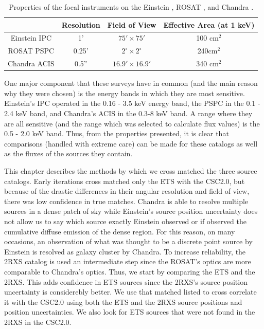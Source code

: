 \begin{table}[H]
    \centering
    \begin{tabular}{cccc}
    \hline
    \hline
          &Resolution & Field of View & Effective Area (at 1 keV) \\
         \hline
        Einstein IPC    & 1'&$75' \times 75'$   & 100 cm$^2$ \\
        ROSAT PSPC    &  0.25'  &  $2^{\circ}\times 2^{\circ}$ & 240cm$^2$  \\
        Chandra ACIS & 0.5'' & $16.9' \times 16.9'$ & 340 cm$^2$ \\
    \hline
    \hline
    \end{tabular}
    \caption{Properties of the focal instruments on the Einstein \citep{giacconietal1979}, ROSAT \citep{Briel1996}, and Chandra \citep{Evans2020}.}
    \label{tab:my_label}
\end{table}

One major component that these surveys have in common (and the main reason why they were chosen) is the energy bands in which they are most sensitive. Einstein’s IPC operated in the 0.16 - 3.5 keV energy band, the PSPC in the 0.1 - 2.4 keV band, and  Chandra’s ACIS in the 0.3-8 keV band. 
A range where they are all sensitive (and the range which was selected to calculate flux values) is the 0.5 - 2.0 keV band. 
Thus, from the properties presented, it is clear that comparisons (handled with extreme care) can be made for these catalogs as well as the fluxes of the sources they contain. 

This chapter describes the methods by which we cross matched the three source catalogs. 
Early iterations cross matched only the ETS with the CSC2.0, but because of the drastic differences in their angular resolution and field of view, there was low confidence in true matches.
Chandra is able to resolve multiple sources in a dense patch of sky while Einstein's source position uncertainty does not allow us to say which source exactly Einstein observed or if observed the cumulative diffuse emission of the dense region. 
For this reason, on many occasions, an observation of what was thought to be a discrete point source by Einstein is resolved as galaxy cluster by Chandra.
To increase reliability, the 2RXS catalog is used an intermediate step since the ROSAT's optics are more comparable to Chandra's optics.
Thus, we start by comparing the ETS and the 2RXS.
This adds confidence in ETS sources since the 2RXS's source position uncertainty is considerebly better.
We use that matched listed to cross correlate it with the CSC2.0 using both the ETS and the 2RXS source positions and position uncertainties. 
We also look for ETS sources that were not found in the 2RXS in the CSC2.0.

